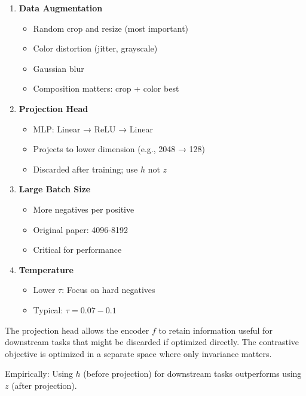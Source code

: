 \begin{enumerate}
    \item \textbf{Data Augmentation}
    \begin{itemize}
        \item Random crop and resize (most important)
        \item Color distortion (jitter, grayscale)
        \item Gaussian blur
        \item Composition matters: crop + color best
    \end{itemize}
    
    \item \textbf{Projection Head}
    \begin{itemize}
        \item MLP: Linear → ReLU → Linear
        \item Projects to lower dimension (e.g., 2048 → 128)
        \item Discarded after training; use $h$ not $z$
    \end{itemize}
    
    \item \textbf{Large Batch Size}
    \begin{itemize}
        \item More negatives per positive
        \item Original paper: 4096-8192
        \item Critical for performance
    \end{itemize}
    
    \item \textbf{Temperature}
    \begin{itemize}
        \item Lower $\tau$: Focus on hard negatives
        \item Typical: $\tau = 0.07-0.1$
    \end{itemize}
\end{enumerate}

\begin{keyinsight}
The projection head allows the encoder $f$ to retain information useful for downstream tasks that might be discarded if optimized directly. The contrastive objective is optimized in a separate space where only invariance matters.

Empirically: Using $h$ (before projection) for downstream tasks outperforms using $z$ (after projection).
\end{keyinsight}

